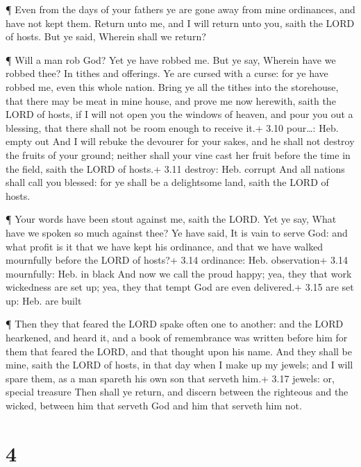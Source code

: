  ¶ Even from the days of your fathers ye are gone away from
mine ordinances, and have not kept them. Return unto me, and I will
return unto you, saith the LORD of hosts. But ye said, Wherein shall we
return?

 ¶ Will a man rob God? Yet ye have robbed me. But ye say,
Wherein have we robbed thee? In tithes and offerings.  Ye
are cursed with a curse: for ye have robbed me, even this whole nation.
 Bring ye all the tithes into the storehouse, that there
may be meat in mine house, and prove me now herewith, saith the LORD of
hosts, if I will not open you the windows of heaven, and pour you out a
blessing, that there shall not be room enough to receive it.+ 3.10
pour\ldots: Heb. empty out  And I will rebuke the devourer
for your sakes, and he shall not destroy the fruits of your ground;
neither shall your vine cast her fruit before the time in the field,
saith the LORD of hosts.+ 3.11 destroy: Heb. corrupt  And
all nations shall call you blessed: for ye shall be a delightsome land,
saith the LORD of hosts.

 ¶ Your words have been stout against me, saith the LORD.
Yet ye say, What have we spoken so much against thee?  Ye
have said, It is vain to serve God: and what profit is it that we have
kept his ordinance, and that we have walked mournfully before the LORD
of hosts?+ 3.14 ordinance: Heb. observation+ 3.14 mournfully: Heb. in
black  And now we call the proud happy; yea, they that work
wickedness are set up; yea, they that tempt God are even delivered.+
3.15 are set up: Heb. are built

 ¶ Then they that feared the LORD spake often one to
another: and the LORD hearkened, and heard it, and a book of remembrance
was written before him for them that feared the LORD, and that thought
upon his name.  And they shall be mine, saith the LORD of
hosts, in that day when I make up my jewels; and I will spare them, as a
man spareth his own son that serveth him.+ 3.17 jewels: or, special
treasure  Then shall ye return, and discern between the
righteous and the wicked, between him that serveth God and him that
serveth him not.

\hypertarget{section-3}{%
\section{4}\label{section-3}}

